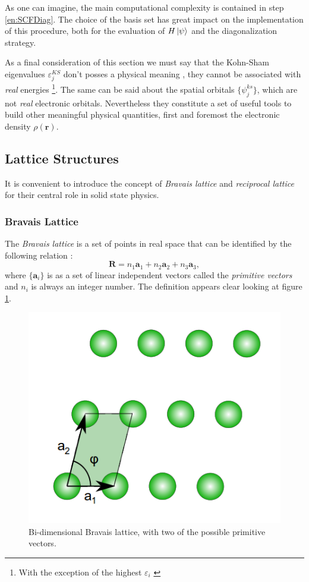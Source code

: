 \documentclass[a4paper,12pt]{article}
\newcommand\dens{\rho(\mathbf{r})}
\begin{document}
As one can imagine, the main computational complexity is contained in step \ref{en:SCFDiag}.
The choice of the basis set has great impact on the implementation of this procedure, both for the evaluation of $H \ket{\psi}$ and the diagonalization strategy. 

As a final consideration of this section we must say that the Kohn-Sham eigenvalues $\varepsilon^{KS}_j$ don't posses a physical meaning \cite[p.144]{Martin}, they cannot be associated with \textit{real} energies \footnote{With the exception of the highest $\varepsilon_{i}$ \cite[p.144]{Martin}}. 
The same can be said about the spatial orbitals  $\{\psi^{ks}_j\}$, which are not \textit{real} electronic orbitals. 
Nevertheless they constitute a set of useful tools to build other meaningful physical quantities, first and foremost the electronic density $\dens$.

\subsection{Lattice Structures}
It is convenient to introduce the concept of \textit{Bravais lattice} and \textit{reciprocal lattice} for their central role in solid state physics. 


\subsubsection{Bravais Lattice}
The \textit{Bravais lattice} is a set of points in real space that can be identified by the following relation :
\begin{equation}\label{eq:BravaisLattice}
	\mathbf{R} = n_{1} \mathbf{a}_{1} + n_{2} \mathbf{a}_{2} + n_{3} \mathbf{a}_{3} ,
\end{equation}
where $\{\mathbf{a}_{i}\}$ is as a set of linear independent vectors called the \textit{primitive vectors} and $n_{i}$ is always an integer number.
The definition appears clear looking at figure \ref{fig:BravaisLattice}.

\begin{figure}[h]
\begin{center}
	\includegraphics[width=0.4\linewidth]{Bravais_2D.png}
	\caption{Bi-dimensional Bravais lattice, with two of the possible primitive vectors.}
	\label{fig:BravaisLattice}
\end{center}
\end{figure}
\end{document}
